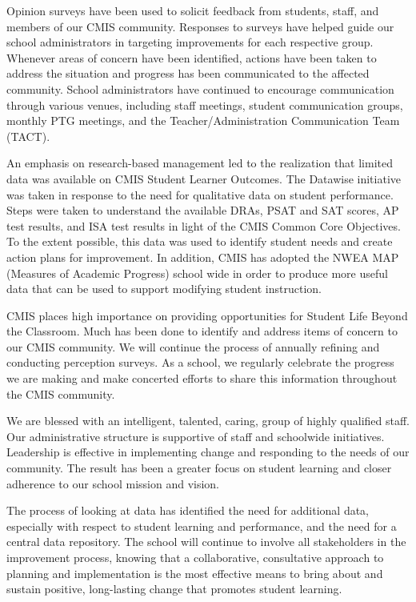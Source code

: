 Opinion surveys have been used to solicit feedback from students, staff, and members of our CMIS community. Responses to surveys have helped guide our school administrators in targeting improvements for each respective group. Whenever areas of concern have been identified, actions have been taken to address the situation and progress has been communicated to the affected community. School administrators have continued to encourage communication through various venues, including staff meetings, student communication groups, monthly PTG meetings, and the Teacher/Administration Communication Team (TACT). 

An emphasis on research-based management led to the realization that limited data was available on CMIS Student Learner Outcomes. The Datawise initiative was taken in response to the need for qualitative data on student performance. Steps were taken to understand the available DRAs, PSAT and SAT scores, AP test results, and ISA test results in light of the CMIS Common Core Objectives. To the extent possible, this data was used to identify student needs and create action plans for improvement. In addition, CMIS has adopted the NWEA MAP (Measures of Academic Progress) school wide in order to produce more useful data that can be used to support modifying student instruction.  

CMIS places high importance on providing opportunities for Student Life Beyond the Classroom. Much has been done to identify and address items of concern to our CMIS community. We will continue the process of annually refining and conducting perception surveys. As a school, we regularly celebrate the progress we are making and make concerted efforts to share this information throughout the CMIS community. 

We are blessed with an intelligent, talented, caring, group of highly qualified staff. Our administrative structure is supportive of staff and schoolwide initiatives. Leadership is effective in implementing change and responding to the needs of our community. The result has been a greater focus on student learning and closer adherence to our school mission and vision. 

The process of looking at data has identified the need for additional data, especially with respect to student learning and performance, and the need for a central data repository. The school will continue to involve all stakeholders in the improvement process, knowing that a collaborative, consultative approach to planning and implementation is the most effective means to bring about and sustain positive, long-lasting change that promotes student learning. 

